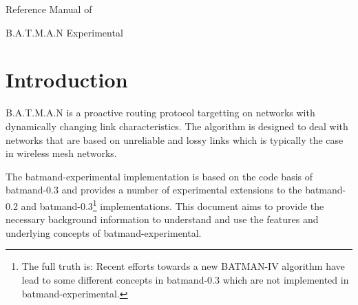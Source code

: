 \documentclass[11pt]{article}
\begin{document}




\begin{center}
{\huge 

\noindent

Reference 
Manual
of

B.A.T.M.A.N Experimental 


}
\end{center}




\tableofcontents


\section {Introduction}
\label{sec:introduction}

B.A.T.M.A.N is a proactive routing protocol targetting on networks with dynamically changing link characteristics.
%
%
The algorithm is designed to deal with networks that are based on unreliable and lossy links which is typically the case in wireless mesh networks.

The batmand-experimental implementation is based on the code basis of batmand-0.3 and provides a number of experimental extensions to the batmand-0.2 and batmand-0.3\footnote{The full truth is: Recent efforts towards a new BATMAN-IV algorithm have lead to some different concepts in batmand-0.3 which are not implemented in batmand-experimental.} implementations.
%
This document aims to provide the necessary background information to understand and use the features and underlying concepts of batmand-experimental.
\end{document}

